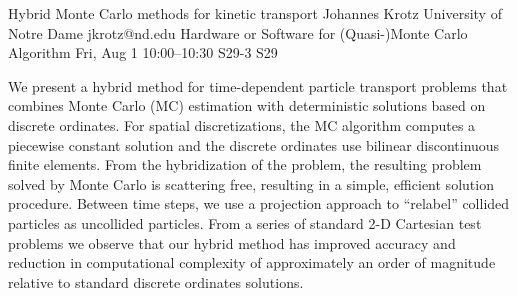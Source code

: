 \begin{talk}


\end{talk}

\begin{talk}
  {Hybrid Monte Carlo methods for kinetic transport}%
  {Johannes Krotz}%
  {University of Notre Dame}%
  {jkrotz@nd.edu}%
  {Hardware or Software for (Quasi-)Monte Carlo Algorithm}%
  {}%
  {Fri, Aug 1 10:00–10:30}%
  {S29-3}%
  {S29}%
				
			

We present a hybrid method for time-dependent particle transport problems that combines Monte Carlo (MC) estimation with deterministic solutions based on discrete ordinates. For spatial discretizations, the MC algorithm computes a piecewise constant solution and the discrete ordinates use bilinear discontinuous finite elements. From the hybridization of the problem, the resulting problem solved by Monte Carlo is scattering free, resulting in a simple, efficient solution procedure. Between time steps, we use a projection approach to “relabel” collided particles as uncollided particles. From a series of standard 2-D Cartesian test problems we observe that our hybrid method has improved accuracy and reduction in computational complexity of approximately an order of magnitude relative to standard discrete ordinates solutions.

\end{talk}

